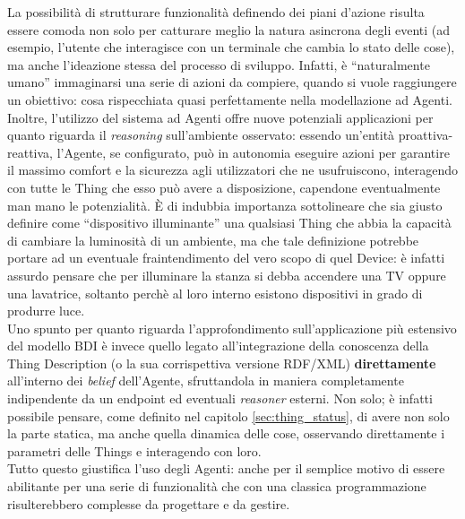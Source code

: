 \documentclass[12pt,a4paper,openright,oneside]{report}
\newcommand{\quotes}[1]{``#1''}
\begin{document}
La possibilità di strutturare funzionalità definendo dei piani d'azione risulta essere comoda non solo per catturare meglio la natura asincrona degli eventi (ad esempio, l'utente che interagisce con un terminale che cambia lo stato delle cose), ma anche l'ideazione stessa del processo di sviluppo. Infatti, è \quotes{naturalmente umano} immaginarsi una serie di azioni da compiere, quando si vuole raggiungere un obiettivo: cosa rispecchiata quasi perfettamente nella modellazione ad Agenti.\\

Inoltre, l'utilizzo del sistema ad Agenti offre nuove potenziali applicazioni per quanto riguarda il \textit{reasoning} sull'ambiente osservato: essendo un'entità proattiva-reattiva, l'Agente, se configurato, può in autonomia eseguire azioni per garantire il massimo comfort e la sicurezza agli utilizzatori che ne usufruiscono, interagendo con tutte le Thing che esso può avere a disposizione, capendone eventualmente man mano le potenzialità. È di indubbia importanza sottolineare che sia giusto definire come \quotes{dispositivo illuminante} una qualsiasi Thing che abbia la capacità di cambiare la luminosità di un ambiente, ma che tale definizione potrebbe portare ad un eventuale fraintendimento del vero scopo di quel Device: è infatti assurdo pensare che per illuminare la stanza si debba accendere una TV oppure una lavatrice, soltanto perchè al loro interno esistono dispositivi in grado di produrre luce.\\

Uno spunto per quanto riguarda l'approfondimento sull'applicazione più estensivo del modello BDI è invece quello legato all'integrazione della conoscenza della Thing Description (o la sua corrispettiva versione RDF/XML) \textbf{direttamente} all'interno dei \textit{belief} dell'Agente, sfruttandola in maniera completamente indipendente da un endpoint ed eventuali \textit{reasoner} esterni. Non solo; è infatti possibile pensare, come definito nel capitolo \ref{sec:thing_status}, di avere non solo la parte statica, ma anche quella dinamica delle cose, osservando direttamente i parametri delle Things e interagendo con loro.\\

Tutto questo giustifica l'uso degli Agenti: anche per il semplice motivo di essere abilitante per una serie di funzionalità che con una classica programmazione risulterebbero complesse da progettare e da gestire.\\

\clearpage
\end{document}
